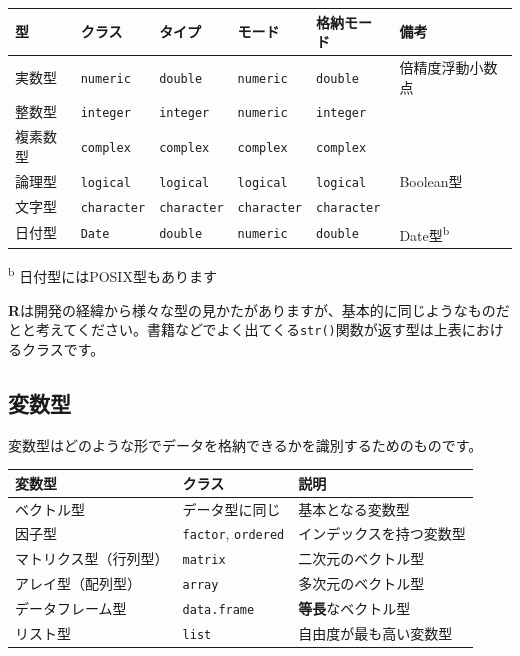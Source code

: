 \documentclass[
  12pt,
]{book}
\begin{document}
\begin{longtable}[]{@{}llllll@{}}
\toprule
型 & クラス & タイプ & モード & 格納モード & 備考 \\
\midrule
\endhead
実数型 & \texttt{numeric} & \texttt{double} & \texttt{numeric} & \texttt{double} & 倍精度浮動小数点 \\
整数型 & \texttt{integer} & \texttt{integer} & \texttt{numeric} & \texttt{integer} & \\
複素数型 & \texttt{complex} & \texttt{complex} & \texttt{complex} & \texttt{complex} & \\
論理型 & \texttt{logical} & \texttt{logical} & \texttt{logical} & \texttt{logical} & Boolean型 \\
文字型 & \texttt{character} & \texttt{character} & \texttt{character} & \texttt{character} & \\
日付型 & \texttt{Date} & \texttt{double} & \texttt{numeric} & \texttt{double} & Date型\textsuperscript{b} \\
\bottomrule
\end{longtable}

\textsuperscript{b} 日付型にはPOSIX型もあります

\textbf{R}は開発の経緯から様々な型の見かたがありますが、基本的に同じようなものだとと考えてください。書籍などでよく出てくる\texttt{str()}関数が返す型は上表におけるクラスです。

\hypertarget{ux5909ux6570ux578b}{%
\subsection{変数型}\label{ux5909ux6570ux578b}}

変数型はどのような形でデータを格納できるかを識別するためのものです。

\begin{longtable}[]{@{}lll@{}}
\toprule
変数型 & クラス & 説明 \\
\midrule
\endhead
ベクトル型 & データ型に同じ & 基本となる変数型 \\
因子型 & \texttt{factor}, \texttt{ordered} & インデックスを持つ変数型 \\
マトリクス型（行列型） & \texttt{matrix} & 二次元のベクトル型 \\
アレイ型（配列型） & \texttt{array} & 多次元のベクトル型 \\
データフレーム型 & \texttt{data.frame} & \textbf{等長}なベクトル型 \\
リスト型 & \texttt{list} & 自由度が最も高い変数型 \\
\bottomrule
\end{longtable}
\end{document}
